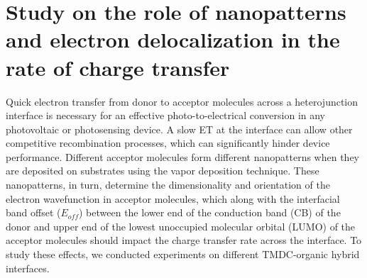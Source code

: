 \documentclass[12pt]{article}
\begin{document}
\section{Study on the role of nanopatterns and electron delocalization in the rate of charge transfer}
Quick electron transfer from donor to acceptor molecules across a heterojunction interface is necessary for an effective photo-to-electrical conversion in any photovoltaic or photosensing device. A slow ET at the interface can allow other competitive recombination processes, which can significantly hinder device performance. Different acceptor molecules form different nanopatterns when they are deposited on substrates using the vapor deposition technique. These nanopatterns, in turn, determine the dimensionality and orientation of the electron wavefunction in acceptor molecules, which along with the interfacial band offset ($E_{off}$) between the lower end of the conduction band (CB) of the donor and upper end of the lowest unoccupied molecular orbital (LUMO) of the acceptor molecules should impact the charge transfer rate across the interface. To study these effects, we conducted experiments on different TMDC-organic hybrid interfaces. 
\end{document}
